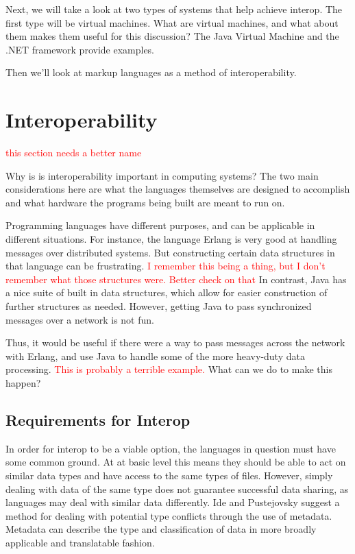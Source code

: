 \documentclass{sig-alternate}
\newcommand{\mycomment}[1]{\textcolor{red}{#1}}
\begin{document}
Next, we will take a look at two types of systems that help achieve interop. The first type will be virtual machines. What are virtual machines, and what about them makes them useful for this discussion? The Java Virtual Machine and the .NET framework provide examples.

Then we'll look at markup languages as a method of interoperability. 

\section{Interoperability}\label{difficulties}
\mycomment{this section needs a better name}

Why is is interoperability important in computing systems? The two main considerations here are what the languages themselves are designed to accomplish and what hardware the programs being built are meant to run on.

Programming languages have different purposes, and can be applicable in different situations. For instance, the language Erlang is very good at handling messages over distributed systems. But constructing certain data structures in that language can be frustrating. \mycomment{I remember this being a thing, but I don't remember what those structures were. Better check on that} 
In contrast, Java has a nice suite of built in data structures, which allow for easier construction of further structures as needed. However, getting Java to pass synchronized messages over a network is not fun.

Thus, it would be useful if there were a way to pass messages across the network with Erlang, and use Java to handle some of the more heavy-duty data processing. \mycomment{This is probably a terrible example.}
What can we do to make this happen?

\subsection*{Requirements for Interop}
In order for interop to be a viable option, the languages in question must have some common ground. At at basic level
this means they should be able to act on similar data types and have access to the same types of files. However, simply dealing with data of the same type does not guarantee successful data sharing, as languages may deal with similar data differently. Ide and Pustejovsky \cite{Ide:2010} suggest a method for dealing with potential type conflicts through the use of metadata. Metadata can describe the type and classification of data in more broadly applicable and translatable fashion.
\end{document}
